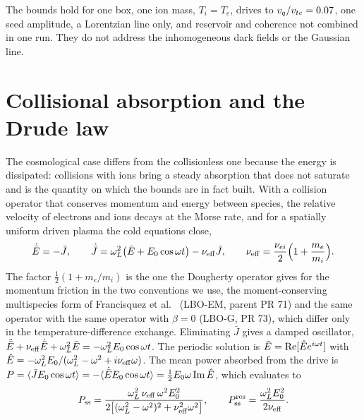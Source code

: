 The bounds hold for one box, one ion mass, $T_i=T_e$, drives to $v_q/v_{te}=0.07$, one seed amplitude, a Lorentzian line only, and reservoir and coherence not combined in one run. They do not address the inhomogeneous dark fields or the Gaussian line.

\section{Collisional absorption and the Drude law}\label{sec:c9-r2}


The cosmological case differs from the collisionless one because the energy is dissipated: collisions with ions bring a steady absorption that does not saturate and is the quantity on which the bounds are in fact built. With a collision operator that conserves momentum and energy between species, the relative velocity of electrons and ions decays at the Morse rate, and for a spatially uniform driven plasma the cold equations close,
\begin{equation}
\dot{\bar E}=-\bar J,\qquad
\dot{\bar J}=\omega_L^2\bigl(\bar E+E_0\cos\omega t\bigr)-\nu_{\rm eff}\bar J,\qquad
\nu_{\rm eff}=\frac{\nu_{ei}}{2}\Bigl(1+\frac{m_e}{m_i}\Bigr).
\label{eq:c9-drude}
\end{equation}
The factor $\tfrac12(1+m_e/m_i)$ is the one the Dougherty operator gives for the momentum friction in the two conventions we use, the moment-conserving multispecies form of Francisquez et al.~\cite{Francisquez2022} (LBO-EM, parent PR 71) and the same operator with the same operator with $\beta=0$ (LBO-G, PR 73), which differ only in the temperature-difference exchange. Eliminating $\bar J$ gives a damped oscillator, $\ddot{\bar E}+\nu_{\rm eff}\dot{\bar E}+\omega_L^2\bar E=-\omega_L^2E_0\cos\omega t$. The periodic solution is $\bar E={\rm Re}[\hat Ee^{i\omega t}]$ with $\hat E=-\omega_L^2E_0/(\omega_L^2-\omega^2+i\nu_{\rm eff}\omega)$. The mean power absorbed from the drive is $P=\langle\bar JE_0\cos\omega t\rangle=-\langle\dot{\bar E}E_0\cos\omega t\rangle=\tfrac12E_0\omega\,{\rm Im}\,\hat E$, which evaluates to
\begin{equation}
P_{\rm ss}=\frac{\omega_L^2\,\nu_{\rm eff}\,\omega^2E_0^2}{2\bigl[(\omega_L^2-\omega^2)^2+\nu_{\rm eff}^2\omega^2\bigr]},\qquad
P_{\rm ss}^{\rm res}=\frac{\omega_L^2E_0^2}{2\nu_{\rm eff}}.
\label{eq:c9-pss}
\end{equation}

